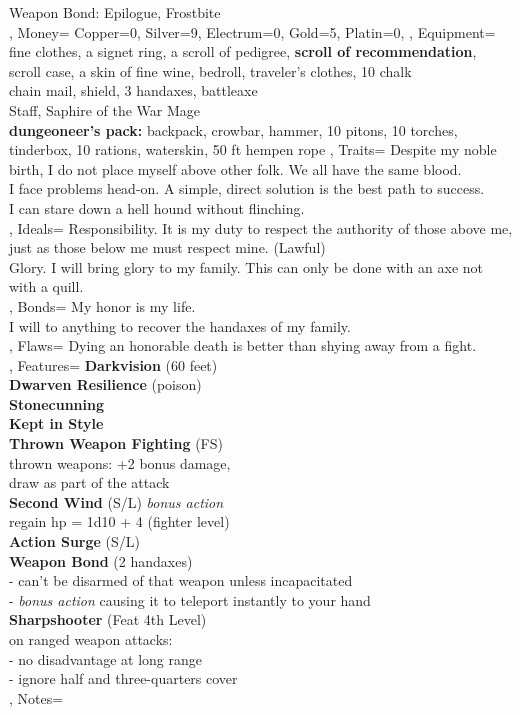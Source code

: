 \documentclass[10pt,a4paper]{scrbook}
\begin{document}
{{{				Weapon Bond: Epilogue, Frostbite\\
			}
		},
		Money={
			Copper=0,
			Silver=9,
			Electrum=0,
			Gold=5,
			Platin=0,
		},
		Equipment={
			fine clothes, a signet ring, a scroll of pedigree, \textbf{scroll of recommendation}, scroll case, a skin of fine wine, bedroll, traveler's clothes, 10 chalk\\
			chain mail, shield, 3 handaxes, battleaxe\\
			Staff, Saphire of the War Mage\\
			\textbf{dungeoneer's pack:} backpack, crowbar, hammer, 10 pitons, 10 torches, tinderbox, 10 rations, waterskin, 50 ft hempen rope
		},
		Traits={
			\tiny
			Despite my noble birth, I do not place myself above other folk. We all have the same blood.\\
			I face problems head-on. A simple, direct solution is the best path to success.\\
			I can stare down a hell hound without flinching.\\
		},
		Ideals={
			\tiny
			Responsibility. It is my duty to respect the authority of those above me, just as those below me must respect mine. (Lawful)\\
			Glory. I will bring glory to my family. This can only be done with an axe not with a quill.\\
		},
		Bonds={
			My honor is my life.\\
			I will to anything to recover the handaxes of my family.\\
		},
		Flaws={
			Dying an honorable death is better than shying away from a fight.\\
		},
		Features={
			\textbf{Darkvision} (60 feet)\\
			\textbf{Dwarven Resilience} (poison)\\
			\textbf{Stonecunning}\\
			\textbf{Kept in Style}\\
			\textbf{Thrown Weapon Fighting} (FS)\\
			thrown weapons: +2 bonus damage,\\
			draw as part of the attack\\
			\textbf{Second Wind} (S/L) \textit{bonus action}\\
			regain hp = 1d10 + 4 (fighter level)\\
			\textbf{Action Surge} (S/L)\\
			\textbf{Weapon Bond} (2 handaxes)\\
			- can't be disarmed of that weapon unless incapacitated\\
			- \textit{bonus action} causing it to teleport instantly to your hand\\
			\textbf{Sharpshooter} (Feat 4th Level)\\
			on ranged weapon attacks:\\
			- no disadvantage at long range\\
			- ignore half and three-quarters cover\\
		},
		Notes={
		}
	}
\end{document}
